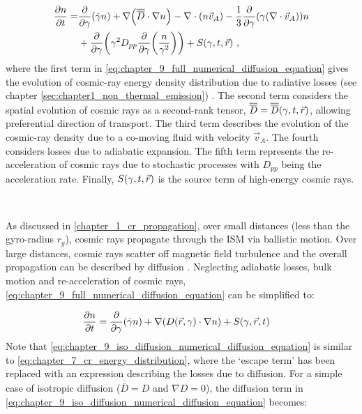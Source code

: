 \begin{equation}
    \begin{aligned}
        \pdv{n}{t}=&\pdv{ }{\gamma}\qty(\dot{\gamma}n)+\nabla\qty(\overline{\overline{D}}\cdot\nabla n)-\nabla\cdot\qty(n\vec{v}_A)-\frac{1}{3}\pdv{ }{\gamma}\qty(\gamma\qty(\nabla\cdot\vec{v}_A))n \\
        &+\pdv{ }{\gamma}\qty(\gamma^2 D_{pp}\pdv{ }{\gamma}\qty(\frac{n}{\gamma^2})) + S\qty(\gamma,t,\vec{r})  \text{ ,}     
    \end{aligned} \label{eq:chapter_9_full_numerical_diffusion_equation}
\end{equation} 
\noindent where the first term in \autoref{eq:chapter_9_full_numerical_diffusion_equation} gives the evolution of cosmic-ray energy density distribution due to radiative losses (see chapter \autoref{sec:chapter1_non_thermal_emission}) . The second term considers the spatial evolution of cosmic rays as a second-rank tensor, $\overline{\overline{D}}=\overline{\overline{D}}\qty(\gamma,t,\vec{r})$, allowing preferential direction of transport. The third term describes the evolution of the cosmic-ray density due to a co-moving fluid with velocity $\vec{v}_A$. The fourth considers losses due to adiabatic expansion. The fifth term represents the re-acceleration of cosmic rays due to stochastic processes with $D_{pp}$ being the acceleration rate. Finally, $S\qty(\gamma,t,\vec{r})$ is the source term of high-energy cosmic rays.
\par~\par
As discussed in \autoref{chapter_1_cr_propagation}, over small distances (less than the gyro-radius $r_g$), cosmic rays propagate through the ISM via ballistic motion. Over large distances, cosmic rays scatter off magnetic field turbulence and the overall propagation can be described by diffusion \citep{2015PhRvD..92h3003P}. Neglecting adiabatic losses, bulk motion and re-acceleration of cosmic rays, \autoref{eq:chapter_9_full_numerical_diffusion_equation} can be simplified to:


\begin{equation}
\begin{aligned}
\pdv{n}{t}&=\pdv{ }{\gamma}\qty(\dot{\gamma}n) + \nabla\qty(D\qty(\vec{r},\gamma)\cdot \nabla n) + S\qty(\gamma,\vec{r},t)
\end{aligned} \label{eq:chapter_9_iso_diffusion_numerical_diffusion_equation}
\end{equation} 
\noindent Note that \autoref{eq:chapter_9_iso_diffusion_numerical_diffusion_equation} is similar to \autoref{eq:chapter_7_cr_energy_distribution}, where the `escape term' has been replaced with an expression describing the losses due to diffusion. For a simple case of isotropic diffusion ($\overline{\overline{D}}=D$ and $\nabla D=0$), the diffusion term in \autoref{eq:chapter_9_iso_diffusion_numerical_diffusion_equation} becomes: 

